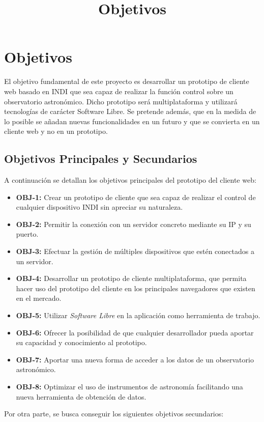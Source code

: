 \chapter{Objetivos}
\title{Objetivos}
\label{cap:Objetivos}

El objetivo fundamental de este proyecto es desarrollar un prototipo de cliente web basado en INDI que sea capaz de realizar la función control sobre un observatorio astronómico. Dicho prototipo será multiplataforma y utilizará tecnologías de carácter Software Libre. Se pretende además, que en la medida de lo posible se añadan nuevas funcionalidades en un futuro y que se convierta en un cliente web y no en un prototipo.


\section{Objetivos Principales y Secundarios}
A continuación se detallan los objetivos principales del prototipo del cliente web:

\begin{itemize}
  \item \textbf{OBJ-1:} Crear un prototipo de cliente que sea capaz de realizar el control de cualquier dispositivo INDI sin apreciar su naturaleza.
  \item \textbf{OBJ-2:} Permitir la conexión con un servidor concreto mediante su IP y su puerto.
  \item \textbf{OBJ-3:} Efectuar la gestión de múltiples dispositivos que estén conectados a un servidor.
  \item \textbf{OBJ-4:} Desarrollar un prototipo de cliente multiplataforma, que permita hacer uso del prototipo del cliente en los principales navegadores que existen en el mercado.
  \item \textbf{OBJ-5:} Utilizar \textit{Software Libre} en la aplicación como herramienta de trabajo.
  \item \textbf{OBJ-6:} Ofrecer la posibilidad de que cualquier desarrollador pueda aportar su capacidad y conocimiento al prototipo.
  \item \textbf{OBJ-7:} Aportar una nueva forma de acceder a los datos de un observatorio astronómico.
  \item \textbf{OBJ-8:} Optimizar el uso de instrumentos de astronomía facilitando una nueva herramienta de obtención de datos.
\end{itemize}

Por otra parte, se busca conseguir los siguientes objetivos secundarios:


